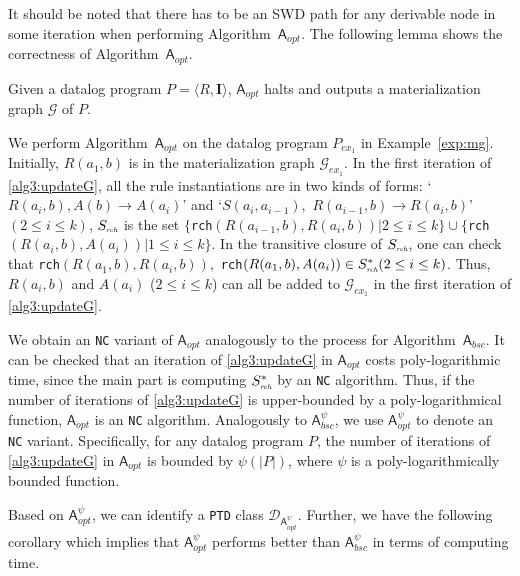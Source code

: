 \documentclass[final,1p,times]{elsarticle}
\begin{document}
It should be noted that there has to be an SWD path for any derivable node in some iteration when performing
Algorithm~$\mathsf{A}_{opt}$.
The following lemma shows the correctness of Algorithm~$\mathsf{A}_{opt}$.

\begin{lemma}\label{lemma:a3}
Given a datalog program $P=\langle R, \textbf{I}\rangle$,
$\mathsf{A}_{opt}$ halts and outputs a materialization graph $\mathcal{G}$ of $P$.
\end{lemma}

\begin{example}\label{exp:opt}
We perform Algorithm~$\mathsf{A}_{opt}$ on the datalog program $P_{ex_1}$ in Example~\ref{exp:mg}.
Initially, $R(a_1,b)$ is in the materialization graph $\mathcal{G}_{ex_1}$.
In the first iteration of \ref{alg3:updateG}, all the rule instantiations are in two kinds of forms:
`$R(a_i,b),A(b)\rightarrow A(a_i)$' and `$S(a_i,a_{i-1}),$ $R(a_{i-1},b)\rightarrow R(a_i,b)$' $(2\leq i\leq k)$,
$S_{\textit{\tiny rch}}$ is the set $\{$\texttt{rch}$(R(a_{i-1},b), R(a_i,b))|2\leq i\leq k\}
\cup\{$\texttt{rch}$(R(a_i,b), A(a_i))|1\leq i\leq k\}$.
In the transitive closure of $S_{\textit{\tiny rch}}$,
one can check that \texttt{rch}$(R(a_1,b), R(a_i,b)),$
\texttt{rch}$(R(a_1,b), A(a_i))\in S^*_{\textit{\tiny rch}}(2\leq i\leq k)$.
Thus, $R(a_i,b)$ and $A(a_i)$ ($2\leq i\leq k$) can all be added to $\mathcal{G}_{ex_1}$
in the first iteration of \ref{alg3:updateG}.
\end{example}

We obtain an \texttt{NC} variant of $\mathsf{A}_{opt}$ analogously to the process for Algorithm~$\mathsf{A}_{bsc}$.
It can be checked that an iteration of \ref{alg3:updateG} in $\mathsf{A}_{opt}$ costs poly-logarithmic
time, since the main part is computing $S^*_{\textit{\tiny rch}}$ by an \texttt{NC} algorithm.
Thus, if the number of iterations of \ref{alg3:updateG} is upper-bounded by a poly-logarithmical function,
$\mathsf{A}_{opt}$ is an \texttt{NC} algorithm.
Analogously to $\mathsf{A}_{bsc}^{\psi}$, we use $\mathsf{A}_{opt}^{\psi}$ to denote an \texttt{NC} variant.
Specifically, for any datalog program $P$, the number of iterations of \ref{alg3:updateG} in $\mathsf{A}_{opt}$
is bounded by $\psi(|P|)$, where $\psi$ is a poly-logarithmically bounded function.

Based on $\mathsf{A}_{opt}^{\psi}$, we can identify a \texttt{PTD} class $\mathcal{D}_{\mathsf{A}_{opt}^{\psi}}$.
Further, we have the following corollary which implies that $\mathsf{A}_{opt}^{\psi}$ performs better
than $\mathsf{A}_{bsc}^{\psi}$ in terms of computing time.
\end{document}
